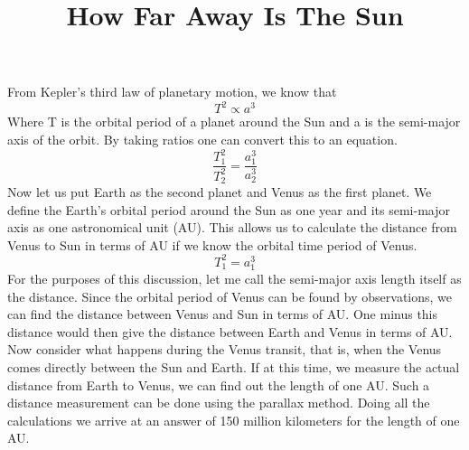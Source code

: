 \documentclass{../template/texnote}
\title{How Far Away Is The Sun}
\begin{document}
    \maketitle {}
From Kepler's third law of planetary motion, we know that 
$$ T^2 \propto a^3$$
Where T is the orbital period of a planet around the Sun and a is the semi-major axis of the orbit.
By taking ratios one can convert this to an equation.
$$ \frac{T_1^2}{T_2^2} = \frac{a_1^3}{a_2^3} $$
Now let us put Earth as the second planet and Venus as the first planet. We define the Earth's orbital period around the Sun as one year and its semi-major axis as one astronomical unit (AU).
This allows us to calculate the distance from Venus to Sun in terms of AU if we know the orbital time period of Venus. $$ T_1^2 = a_1^3$$
For the purposes of this discussion, let me call the semi-major axis length itself as the distance.
Since the orbital period of Venus can be found by observations, we can find the distance between Venus and Sun in terms of AU.
One minus this distance would then give the distance between Earth and Venus in terms of AU.
Now consider what happens during the Venus transit, that is, when the Venus comes directly between the Sun and Earth.
If at this time, we measure the actual distance from Earth to Venus, we can find out the length of one AU.
Such a distance measurement can be done using the parallax method.
Doing all the calculations we arrive at an answer of 150 million kilometers for the length of one AU.

    \printbibliography
\end{document}
